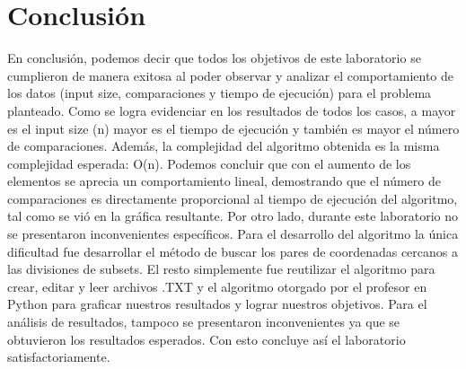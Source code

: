 \section{Conclusión}
En conclusión, podemos decir que todos los objetivos de este laboratorio se cumplieron de manera exitosa al poder observar y analizar el comportamiento de los datos (input size, comparaciones y tiempo de ejecución) para el problema planteado. Como se logra evidenciar en los resultados de todos los casos, a mayor es el input size (n) mayor es el tiempo de ejecución y también es mayor el número de comparaciones. Además, la complejidad del algoritmo obtenida es la misma complejidad esperada: O(n). Podemos concluir que con el aumento de los elementos se aprecia un comportamiento lineal, demostrando que el número de comparaciones es directamente proporcional al tiempo de ejecución del algoritmo, tal como se vió en la gráfica resultante. Por otro lado, durante este laboratorio no se presentaron inconvenientes específicos. Para el desarrollo del algoritmo la única dificultad fue desarrollar el método de buscar los pares de coordenadas cercanos a las divisiones de subsets. El resto simplemente fue reutilizar el algoritmo para crear, editar y leer archivos .TXT y el algoritmo otorgado por el profesor en Python para graficar nuestros resultados y lograr nuestros objetivos. Para el análisis de resultados, tampoco se presentaron inconvenientes ya que se obtuvieron los resultados esperados. Con esto concluye así el laboratorio satisfactoriamente.